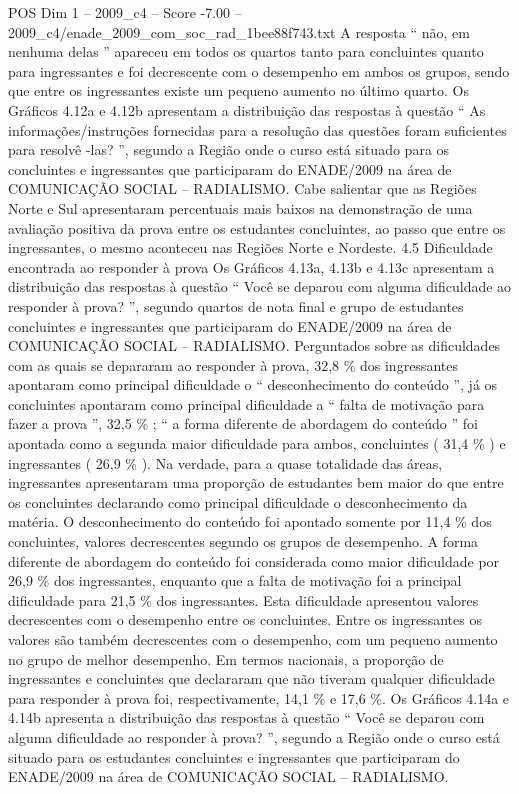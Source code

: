 \begin{textsample}{POS Dim 1 – 2009\_c4 – Score -7.00 – 2009\_c4/enade\_2009\_com\_soc\_rad\_1bee88f743.txt}
A resposta “ não, em nenhuma delas ” apareceu em todos os quartos tanto para concluintes quanto para ingressantes e foi decrescente com o desempenho em ambos os grupos, sendo que entre os ingressantes existe um pequeno aumento no último quarto.
Os Gráficos 4.12a e 4.12b apresentam a distribuição das respostas à questão “ As informações/instruções fornecidas para a resolução das questões foram suficientes para resolvê -las? ”, segundo a Região onde o curso está situado para os concluintes e ingressantes que participaram do ENADE/2009 na área de COMUNICAÇÃO SOCIAL – RADIALISMO.
Cabe salientar que as Regiões Norte e Sul apresentaram percentuais mais baixos na demonstração de uma avaliação positiva da prova entre os estudantes concluintes, ao passo que entre os ingressantes, o mesmo aconteceu nas Regiões Norte e Nordeste. 4.5 Dificuldade encontrada ao responder à prova Os Gráficos 4.13a, 4.13b e 4.13c apresentam a distribuição das respostas à questão “ Você se deparou com alguma dificuldade ao responder à prova? ”, segundo quartos de nota final e grupo de estudantes concluintes e ingressantes que participaram do ENADE/2009 na área de COMUNICAÇÃO SOCIAL – RADIALISMO.
Perguntados sobre as dificuldades com as quais se depararam ao responder à prova, 32,8 \% dos ingressantes apontaram como principal dificuldade o “ desconhecimento do conteúdo ”, já os concluintes apontaram como principal dificuldade a “ falta de motivação para fazer a prova ”, 32,5 \% ; “ a forma diferente de abordagem do conteúdo ” foi apontada como a segunda maior dificuldade para ambos, concluintes ( 31,4 \% ) e ingressantes ( 26,9 \% ).
Na verdade, para a quase totalidade das áreas, ingressantes apresentaram uma proporção de estudantes bem maior do que entre os concluintes declarando como principal dificuldade o desconhecimento da matéria.
O desconhecimento do conteúdo foi apontado somente por 11,4 \% dos concluintes, valores decrescentes segundo os grupos de desempenho.
A forma diferente de abordagem do conteúdo foi considerada como maior dificuldade por 26,9 \% dos ingressantes, enquanto que a falta de motivação foi a principal dificuldade para 21,5 \% dos ingressantes.
Esta dificuldade apresentou valores decrescentes com o desempenho entre os concluintes.
Entre os ingressantes os valores são também decrescentes com o desempenho, com um pequeno aumento no grupo de melhor desempenho.
Em termos nacionais, a proporção de ingressantes e concluintes que declararam que não tiveram qualquer dificuldade para responder à prova foi, respectivamente, 14,1 \% e 17,6 \%.
Os Gráficos 4.14a e 4.14b apresenta a distribuição das respostas à questão “ Você se deparou com alguma dificuldade ao responder à prova? ”, segundo a Região onde o curso está situado para os estudantes concluintes e ingressantes que participaram do ENADE/2009 na área de COMUNICAÇÃO SOCIAL – RADIALISMO.

\end{textsample}
